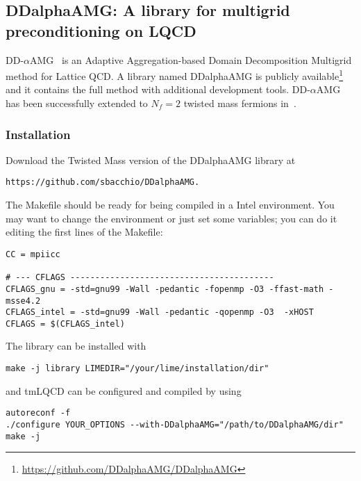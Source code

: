 
\subsection{DDalphaAMG: A library for multigrid preconditioning on LQCD}


DD-$\alpha$AMG~\cite{Frommer:2013fsa} is an Adaptive Aggregation-based Domain Decomposition Multigrid method for Lattice QCD. A library named DDalphaAMG is publicly available\footnote{\url{https://github.com/DDalphaAMG/DDalphaAMG}} and it contains the full method with additional development tools. DD-$\alpha$AMG has been successfully extended to $N_f=2$ twisted mass fermions in~\cite{Alexandrou:2016}.


\subsubsection{Installation}

Download the Twisted Mass version of the DDalphaAMG library at 
\begin{Verbatim}[fontsize=\small]
https://github.com/sbacchio/DDalphaAMG.
\end{Verbatim}
The Makefile should be ready for being compiled in a Intel environment. You may want to change the environment or just set some variables; you can do it editing the first lines of the Makefile:
\begin{Verbatim}[fontsize=\small]
CC = mpiicc

# --- CFLAGS -----------------------------------------                          
CFLAGS_gnu = -std=gnu99 -Wall -pedantic -fopenmp -O3 -ffast-math -msse4.2
CFLAGS_intel = -std=gnu99 -Wall -pedantic -qopenmp -O3  -xHOST
CFLAGS = $(CFLAGS_intel)
\end{Verbatim}
The library can be installed with
\begin{Verbatim}[fontsize=\small]
make -j library LIMEDIR="/your/lime/installation/dir" 
\end{Verbatim}
and tmLQCD can be configured and compiled by using
\begin{Verbatim}[fontsize=\small]
autoreconf -f
./configure YOUR_OPTIONS --with-DDalphaAMG="/path/to/DDalphaAMG/dir"
make -j
\end{Verbatim}

